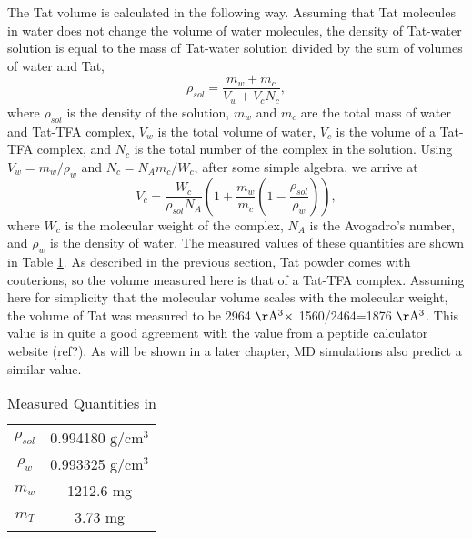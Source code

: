 \documentclass[letterpaper,12pt]{article}
\begin{document}
The Tat volume is calculated in the following way. Assuming that Tat
molecules in water does not change the volume of water molecules, the density
of Tat-water solution is equal to the mass of Tat-water solution divided
by the sum of volumes of water and Tat, 
\begin{equation}
  \rho_{sol} = \frac{m_w+m_c}{V_w+V_cN_c},
\end{equation}
where $\rho_{sol}$ is the density of the solution, $m_w$ and $m_c$
are the total mass of water and Tat-TFA complex, $V_w$ is the total volume of 
water, $V_c$ is the volume of a Tat-TFA complex, and $N_c$ is the total number 
of the complex in the solution. Using $V_w=m_w/\rho_w$ and $N_c=N_Am_c/W_c$, after some
simple algebra, we arrive at
\begin{equation}
  V_c = \frac{W_c}{\rho_{sol}N_A} \left( 
        1 + \frac{m_w}{m_c}\left(1-\frac{\rho_{sol}}{\rho_w}\right) 
        \right),
\end{equation}
where $W_c$ is the molecular weight of the complex, $N_A$ is the Avogadro's number,
and $\rho_w$ is the density of water. The measured values of these quantities
are shown in Table \ref{tb:values}. As described in the previous section, 
Tat powder comes with couterions, so the volume measured here is that 
of a Tat-TFA complex. Assuming here for simplicity that the molecular
volume scales with the molecular weight, the volume of Tat was measured to be
2964 $\mathrm{\AA^3} \times$ 1560/2464=1876 $\mathrm{\AA^3}$. This value is in quite a good agreement with the 
value from a peptide calculator website (ref?). As will be shown in a later 
chapter, MD simulations also predict a similar value.

\begin{table}[ht]
  \centering
  \begin{tabular}{c c}
    $\rho_{sol}$ & 0.994180 $\mathrm{g/cm^3}$\\
    $\rho_w$ & 0.993325 $\mathrm{g/cm^3}$\\
    $m_w$ & 1212.6 mg \\
    $m_T$ & 3.73 mg \\ 
  \end{tabular}
  \caption{Measured Quantities in }
  \label{tb:values}
\end{table}
\end{document}
